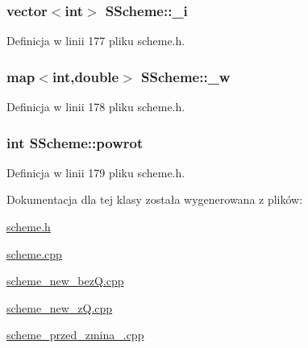 \subsubsection[{\+\_\+i}]{\setlength{\rightskip}{0pt plus 5cm}vector$<$int$>$ S\+Scheme\+::\+\_\+i}\label{class_s_scheme_a875c9280df6dcdbc3a41ef1c148202da}


Definicja w linii 177 pliku scheme.\+h.

\hypertarget{class_s_scheme_a7d998bc77fe043ec3dfba082bf7c570a}{}
\subsubsection[{\+\_\+w}]{\setlength{\rightskip}{0pt plus 5cm}map$<$int,double$>$ S\+Scheme\+::\+\_\+w}\label{class_s_scheme_a7d998bc77fe043ec3dfba082bf7c570a}


Definicja w linii 178 pliku scheme.\+h.

\hypertarget{class_s_scheme_a6c8e7253815c7ac85996ee8fba438f53}{}
\subsubsection[{powrot}]{\setlength{\rightskip}{0pt plus 5cm}int S\+Scheme\+::powrot}\label{class_s_scheme_a6c8e7253815c7ac85996ee8fba438f53}


Definicja w linii 179 pliku scheme.\+h.



Dokumentacja dla tej klasy została wygenerowana z plików\+:\begin{DoxyCompactItemize}
\item 
\hyperlink{scheme_8h}{scheme.\+h}\item 
\hyperlink{scheme_8cpp}{scheme.\+cpp}\item 
\hyperlink{scheme__new__bez_q_8cpp}{scheme\+\_\+new\+\_\+bez\+Q.\+cpp}\item 
\hyperlink{scheme__new__z_q_8cpp}{scheme\+\_\+new\+\_\+z\+Q.\+cpp}\item 
\hyperlink{scheme__przed__zmina__09092015_8cpp}{scheme\+\_\+przed\+\_\+zmina\+\_.\+cpp}\end{DoxyCompactItemize}
